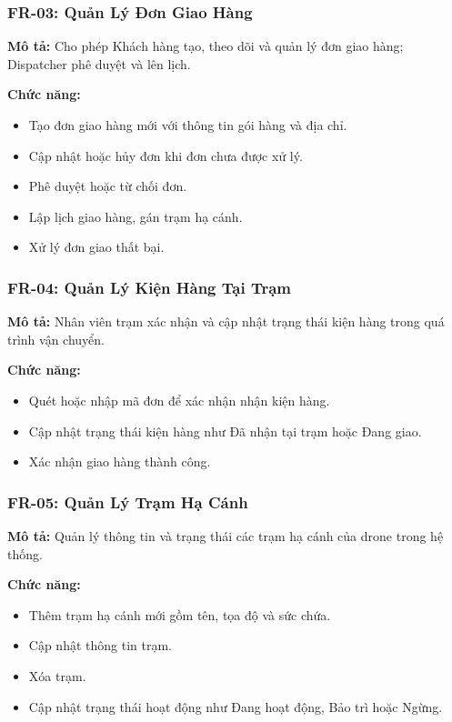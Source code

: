 \subsubsection{FR-03: Quản Lý Đơn Giao Hàng}
\textbf{Mô tả:} Cho phép Khách hàng tạo, theo dõi và quản lý đơn giao hàng; Dispatcher phê duyệt và lên lịch.

\textbf{Chức năng:}
\begin{itemize}
  \item Tạo đơn giao hàng mới với thông tin gói hàng và địa chỉ.
  \item Cập nhật hoặc hủy đơn khi đơn chưa được xử lý.
  \item Phê duyệt hoặc từ chối đơn.
  \item Lập lịch giao hàng, gán trạm hạ cánh.
  \item Xử lý đơn giao thất bại.
\end{itemize}

\subsubsection{FR-04: Quản Lý Kiện Hàng Tại Trạm}
\textbf{Mô tả:} Nhân viên trạm xác nhận và cập nhật trạng thái kiện hàng trong quá trình vận chuyển.

\textbf{Chức năng:}
\begin{itemize}
  \item Quét hoặc nhập mã đơn để xác nhận nhận kiện hàng.
  \item Cập nhật trạng thái kiện hàng như Đã nhận tại trạm hoặc Đang giao.
  \item Xác nhận giao hàng thành công.
\end{itemize}

\subsubsection{FR-05: Quản Lý Trạm Hạ Cánh}
\textbf{Mô tả:} Quản lý thông tin và trạng thái các trạm hạ cánh của drone trong hệ thống.

\textbf{Chức năng:}
\begin{itemize}
  \item Thêm trạm hạ cánh mới gồm tên, tọa độ và sức chứa.
  \item Cập nhật thông tin trạm.
  \item Xóa trạm.
  \item Cập nhật trạng thái hoạt động như Đang hoạt động, Bảo trì hoặc Ngừng.
\end{itemize}

